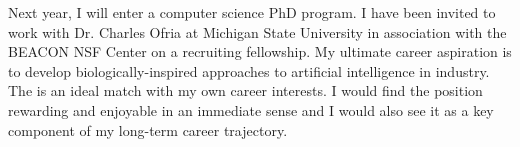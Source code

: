 Next year, I will enter a computer science PhD program.
I have been invited to work with Dr.
Charles Ofria at Michigan State University in association with the BEACON NSF Center on a recruiting fellowship.
My ultimate career aspiration is to develop biologically-inspired approaches to artificial intelligence in industry.
The {\companyposition} is an ideal match with my own career interests.
I would find the position rewarding and enjoyable in an immediate sense and I would also see it as a key component of my long-term career trajectory.
